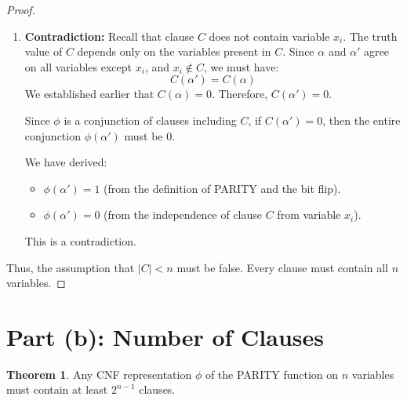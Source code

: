 \documentclass[12pt,a4paper]{article}
\theoremstyle{definition}
\newtheorem{theorem}{Theorem}
\begin{document}
\begin{proof}
\begin{enumerate}
    \item \textbf{Contradiction:}
    Recall that clause $C$ does not contain variable $x_i$. The truth value of $C$ depends only on the variables present in $C$.
    Since $\alpha$ and $\alpha'$ agree on all variables except $x_i$, and $x_i \notin C$, we must have:
    \[ C(\alpha') = C(\alpha) \]
    We established earlier that $C(\alpha) = 0$. Therefore, $C(\alpha') = 0$.
    
    Since $\phi$ is a conjunction of clauses including $C$, if $C(\alpha') = 0$, then the entire conjunction $\phi(\alpha')$ must be 0.
    
    We have derived:
    \begin{itemize}
        \item $\phi(\alpha') = 1$ (from the definition of PARITY and the bit flip).
        \item $\phi(\alpha') = 0$ (from the independence of clause $C$ from variable $x_i$).
    \end{itemize}
    This is a contradiction.
\end{enumerate}

Thus, the assumption that $|C| < n$ must be false. Every clause must contain all $n$ variables.
\end{proof}

\section*{Part (b): Number of Clauses}

\begin{theorem}
Any CNF representation $\phi$ of the PARITY function on $n$ variables must contain at least $2^{n-1}$ clauses.
\end{theorem}
\end{document}
